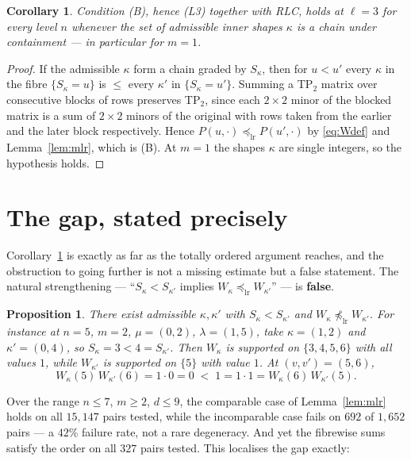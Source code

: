 \documentclass[11pt]{article}
\theoremstyle{plain}
\newtheorem{proposition}[theorem]{Proposition}
\newtheorem{corollary}[theorem]{Corollary}
\theoremstyle{definition}
\newcommand{\lr}{\preceq_{\mathrm{lr}}}
\begin{document}
\begin{corollary}\label{cor:m1}
Condition \textup{(B)}, hence \textup{(L3)} together with RLC, holds at $\ell=3$ for every level $n$
whenever the set of admissible inner shapes $\kappa$ is a chain under containment --- in particular
for $m=1$.
\end{corollary}

\begin{proof}
If the admissible $\kappa$ form a chain graded by $S_\kappa$, then for $u<u'$ every $\kappa$ in the
fibre $\{S_\kappa=u\}$ is $\le$ every $\kappa'$ in $\{S_\kappa=u'\}$. Summing a TP$_2$ matrix over
consecutive blocks of rows preserves TP$_2$, since each $2\times2$ minor of the blocked matrix is a
sum of $2\times2$ minors of the original with rows taken from the earlier and the later block
respectively. Hence $P(u,\cdot)\lr P(u',\cdot)$ by \eqref{eq:Wdef} and Lemma~\ref{lem:mlr}, which is
(B). At $m=1$ the shapes $\kappa$ are single integers, so the hypothesis holds.
\end{proof}

\section{The gap, stated precisely}\label{sec:gap}

Corollary~\ref{cor:m1} is exactly as far as the totally ordered argument reaches, and the obstruction
to going further is not a missing estimate but a false statement. The natural strengthening ---
``$S_\kappa<S_{\kappa'}$ implies $W_\kappa\lr W_{\kappa'}$'' --- is \textbf{false}.

\begin{proposition}\label{prop:gapwitness}
There exist admissible $\kappa,\kappa'$ with $S_\kappa<S_{\kappa'}$ and $W_\kappa\not\lr W_{\kappa'}$.
For instance at $n=5$, $m=2$, $\mu=(0,2)$, $\lambda=(1,5)$, take $\kappa=(1,2)$ and $\kappa'=(0,4)$,
so $S_\kappa=3<4=S_{\kappa'}$. Then $W_\kappa$ is supported on $\{3,4,5,6\}$ with all values $1$,
while $W_{\kappa'}$ is supported on $\{5\}$ with value $1$. At $(v,v')=(5,6)$,
\[
W_\kappa(5)\,W_{\kappa'}(6)=1\cdot0=0\;<\;1=1\cdot1=W_\kappa(6)\,W_{\kappa'}(5).
\]
\end{proposition}

Over the range $n\le7$, $m\ge2$, $d\le9$, the comparable case of Lemma~\ref{lem:mlr} holds on all
$15{,}147$ pairs tested, while the incomparable case fails on $692$ of $1{,}652$ pairs --- a $42\%$
failure rate, not a rare degeneracy. And yet the fibrewise sums satisfy the order on all $327$ pairs
tested. This localises the gap exactly:
\end{document}
